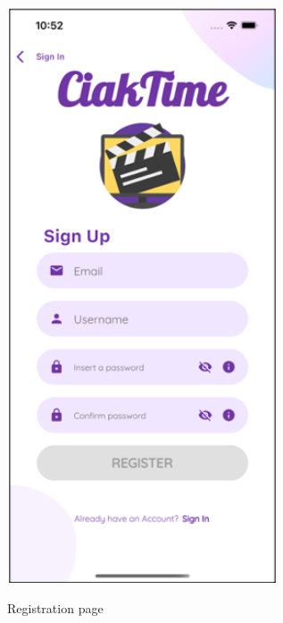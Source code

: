 \documentclass[12pt, a4paper]{article}
\numberwithin{figure}{section}
\begin{document}
\begin{center}
	\begin{minipage}[t]{0.31\textwidth}
		\begin{figure}[H]
			\centering
			\includegraphics[width=0.71\textwidth]{images/final/registration.png}\\
			\caption{Registration page}
		\end{figure}
	\end{minipage}
	\hspace{0.015\linewidth}
	\begin{minipage}[t]{0.31\textwidth}
		\begin{figure}[H]
			\centering

\end{figure}
\end{minipage}
\end{center}
\end{document}
